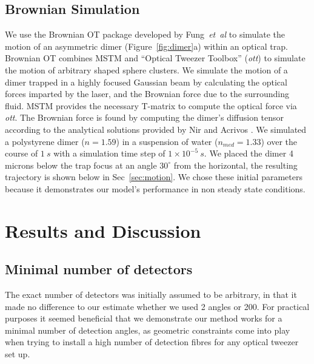 \documentclass[final,  3p]{elsarticle}
\begin{document}
\subsection{Brownian Simulation}
\label{sec:brownian}

We use the Brownian OT package developed by Fung~\textit{et~al} \cite{Vigilante2020Brownian_OT} to simulate the motion of an asymmetric dimer (Figure~\ref{fig:dimer}a) within an optical trap. Brownian OT combines MSTM \cite{Mishchenko1996MSTM} and ``Optical Tweezer Toolbox'' (\textit{ott}) \cite{Lenton2020} to simulate the motion of arbitrary
shaped sphere clusters. We simulate the motion of a dimer trapped in a highly focused Gaussian beam by calculating the optical forces imparted by the laser, and the Brownian force due to the surrounding fluid. MSTM provides the necessary T-matrix to compute the optical force via \textit{ott}. The Brownian force is found by computing the dimer's diffusion tensor according to the analytical solutions provided by Nir and Acrivos \cite{nir_acrivos_1973}. We simulated a polystyrene dimer ($n = 1.59$) in a suspension of water ($n_{med} = 1.33$) over the course of $1 \ s$ with a simulation time step of $1 \times 10^{-5} \ s$. We placed the dimer 4 microns below the trap focus at an angle $30^{\circ}$ from the horizontal, the resulting trajectory is shown below in Sec~\ref{sec:motion}. We chose these initial parameters because it demonstrates our model's performance in non steady state conditions. 

\section{Results and  Discussion}
\label{sec:Discussion}
\subsection{Minimal number of detectors}
\label{sec:detectors}
The exact number of detectors was initially assumed to be arbitrary, in that it made no difference to our estimate whether we used 2 angles or 200. For practical purposes it seemed beneficial that we demonstrate our method works for a minimal number of detection angles, as geometric constraints come into play when trying to install a high number of detection fibres for any optical tweezer set up. 
\end{document}
